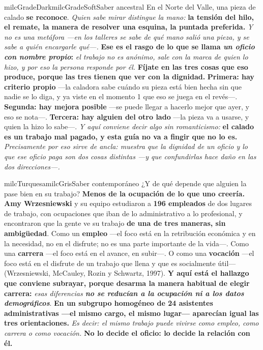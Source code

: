 \documentclass[11pt,letterpaper]{article}
\begin{document}
\begin{softbox}{milcGradeDark}{milcGradeSoft}{Saber ancestral}
En el Norte del Valle, una pieza de calado \textbf{se reconoce}. \emph{Quien sabe mirar distingue la mano:} \textbf{la tensión del hilo, el remate, la manera de resolver una esquina, la puntada preferida.} \emph{Y no es una metáfora ---en los talleres se sabe de qué mano salió una pieza, y se sabe a quién encargarle qué---.} \textbf{Ese es el rasgo de lo que se llama \emph{un oficio con nombre propio}:} \emph{el trabajo no es anónimo, sale con la marca de quien lo hizo, y por eso la persona responde por él.} \textbf{Fíjate en las tres cosas que eso produce, porque las tres tienen que ver con la dignidad.} \textbf{Primera: hay criterio propio} ---la caladora sabe cuándo su pieza está bien hecha sin que nadie se lo diga, y ya viste en el momento 1 que eso se juega en el revés---. \textbf{Segunda: hay mejora posible} ---se puede llegar a hacerlo mejor que ayer, y eso se nota---. \textbf{Tercera: hay alguien del otro lado} ---la pieza va a usarse, y quien la hizo lo sabe---. \emph{Y aquí conviene decir algo sin romanticismo:} \textbf{el calado es un trabajo mal pagado, y esta guía no va a fingir que no lo es.} \emph{Precisamente por eso sirve de ancla: muestra que la dignidad de un oficio y lo que ese oficio paga son dos cosas distintas ---y que confundirlas hace daño en las dos direcciones---.}
\end{softbox}

\begin{softbox}{milcTurquesa}{milcGris}{Saber contemporáneo}
¿Y de qué depende que alguien la pase bien en su trabajo? \textbf{Menos de la ocupación de lo que uno creería.} \textbf{Amy Wrzesniewski} y su equipo estudiaron a \textbf{196 empleados} de dos lugares de trabajo, con ocupaciones que iban de lo administrativo a lo profesional, y encontraron que la gente ve su trabajo \textbf{de una de tres maneras, sin ambigüedad}. Como un \textbf{empleo} ---el foco está en la retribución económica y en la necesidad, no en el disfrute; no es una parte importante de la vida---. Como una \textbf{carrera} ---el foco está en el avance, en subir---. O como una \textbf{vocación} ---el foco está en el disfrute de un trabajo que llena y que es socialmente útil--- (Wrzesniewski, McCauley, Rozin y Schwartz, 1997). \textbf{Y aquí está el hallazgo que conviene subrayar, porque desarma la manera habitual de elegir carrera:} \emph{esas diferencias \textbf{no se reducían a la ocupación ni a los datos demográficos}}. \textbf{En un subgrupo homogéneo de \textbf{24 asistentes administrativas} ---el mismo cargo, el mismo lugar--- aparecían igual las tres orientaciones.} \emph{Es decir: el mismo trabajo puede vivirse como empleo, como carrera o como vocación.} \textbf{No lo decide el oficio: lo decide la relación con él.}
\end{softbox}
\end{document}
